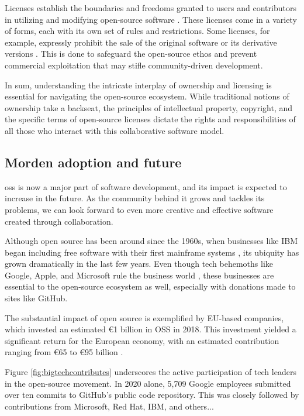 Licenses establish the boundaries and freedoms granted to users and contributors in utilizing and modifying open-source software \cite{laurent2004understanding}. These licenses come in a variety of forms, each with its own set of rules and restrictions. Some licenses, for example, expressly prohibit the sale of the original software or its derivative versions \cite{madison2003reconstructing}. This is done to safeguard the open-source ethos and prevent commercial exploitation that may stifle community-driven development.

In sum, understanding the intricate interplay of ownership and licensing is essential for navigating the open-source ecosystem. While traditional notions of ownership take a backseat, the principles of intellectual property, copyright, and the specific terms of open-source licenses dictate the rights and responsibilities of all those who interact with this collaborative software model.


\subsection{Morden adoption and future}
\ac{oss} is now a major part of software development, and its impact is expected to increase in the future. As the community behind it grows and tackles its problems, we can look forward to even more creative and effective software created through collaboration.

Although open source has been around since the 1960s, when businesses like IBM began including free software with their first mainframe systems \cite{moreno2006open}, its ubiquity has grown dramatically in the last few years.  Even though tech behemoths like Google, Apple, and Microsoft rule the business world \cite{jacobides2020regulating}, these businesses are essential to the open-source ecosystem as well, especially with donations made to sites like GitHub.

The substantial impact of open source is exemplified by EU-based companies, which invested an estimated €1 billion in OSS in 2018. This investment yielded a significant return for the European economy, with an estimated contribution ranging from €65 to €95 billion \cite{blind2021impact}.

Figure \ref{fig:bigtechcontributes} underscores the active participation of tech leaders in the open-source movement.  In 2020 alone, 5,709 Google employees submitted over ten commits to GitHub's public code repository. This was closely followed by contributions from Microsoft, Red Hat, IBM, and others...

